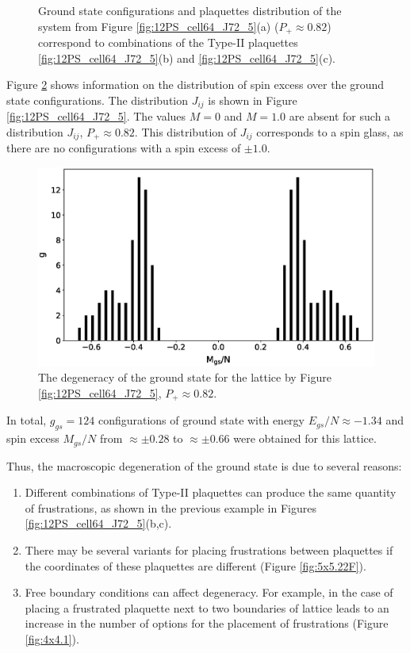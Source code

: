 \documentclass[preprint,12pt]{elsarticle}
\begin{document}
\begin{figure}[H]
\begin{minipage}[h]{0.3\linewidth}
		\end{minipage}
		\caption{Ground state configurations  and plaquettes distribution of the system from Figure \ref{fig:12PS_cell64_J72_5}(a) ($P_+\approx0.82$) correspond to combinations of the Type-II plaquettes \ref{fig:12PS_cell64_J72_5}(b) and \ref{fig:12PS_cell64_J72_5}(c).}
		\label{fig:12F_cell64_J72_5}
	\end{figure}
	
	Figure \ref{fig:g_Mgs} shows information on the distribution of spin excess over the ground state configurations. The distribution $J_{ij}$ is shown in Figure \ref{fig:12PS_cell64_J72_5}. The values $M=0$ and $M=1.0$ are absent for such a distribution $J_{ij}$, $P_+\approx0.82$. This distribution of $J_{ij}$ corresponds to a spin glass, as there are no configurations with a spin excess of $\pm1.0$.
	
	\begin{figure}[H]
		\centering
		\includegraphics[width=0.8\linewidth]{pictures/g_Mgs.eps}
		\caption{The degeneracy of the ground state for the lattice by Figure \ref{fig:12PS_cell64_J72_5}, $P_+\approx0.82$.}
		\label{fig:g_Mgs}
	\end{figure}
	
	In total, $g_{gs}=124$ configurations of ground state with energy $E_{gs}/N \approx -1.34$ and spin excess $M_{gs}/N$ from $\approx \pm 0.28$ to $\approx \pm 0.66$ were obtained for this lattice. 
	
	Thus, the macroscopic degeneration of the ground state is due to several reasons:
	
	\begin{enumerate}
		\item Different combinations of Type-II plaquettes can produce the same quantity of frustrations, as shown in the previous example in Figures \ref{fig:12PS_cell64_J72_5}(b,c).
		\item There may be several variants for placing frustrations between plaquettes if the coordinates of these plaquettes are different (Figure \ref{fig:5x5.22F}).
		\item Free boundary conditions can affect degeneracy. For example, in the case of placing a frustrated plaquette next to two boundaries of lattice leads to an increase in the number of options for the placement of frustrations (Figure \ref{fig:4x4.1}).
	\end{enumerate}
	
\end{document}
